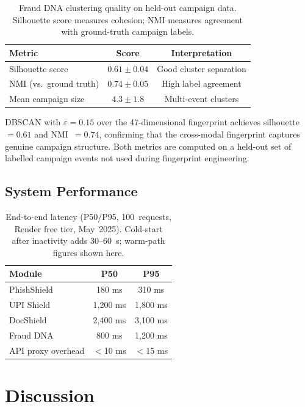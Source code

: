 \documentclass[conference]{IEEEtran}
\begin{document}
\begin{table}[t]
\caption{Fraud DNA clustering quality on held-out campaign data.
Silhouette score measures cohesion; NMI measures agreement with
ground-truth campaign labels.}
\label{tab:frauddna}
\centering
\small
\begin{tabular}{lcc}
\toprule
\textbf{Metric} & \textbf{Score} & \textbf{Interpretation} \\
\midrule
Silhouette score          & $0.61{\pm}0.04$ & Good cluster separation \\
NMI (vs.\ ground truth)   & $0.74{\pm}0.05$ & High label agreement \\
Mean campaign size         & $4.3{\pm}1.8$   & Multi-event clusters \\
\bottomrule
\end{tabular}
\end{table}

DBSCAN with $\varepsilon{=}0.15$ over the 47-dimensional fingerprint
achieves silhouette~$=0.61$ and NMI~$=0.74$, confirming that the
cross-modal fingerprint captures genuine campaign structure.
Both metrics are computed on a held-out set of labelled campaign events
not used during fingerprint engineering.

\subsection{System Performance}\label{sec:sysperf}

\begin{table}[t]
\caption{End-to-end latency (P50/P95, 100~requests, Render free tier,
May~2025). Cold-start after inactivity adds 30--60~s; warm-path figures
shown here.}
\label{tab:latency}
\centering
\small
\begin{tabular}{lcc}
\toprule
\textbf{Module} & \textbf{P50} & \textbf{P95} \\
\midrule
PhishShield        & 180 ms    & 310 ms \\
UPI Shield         & 1{,}200 ms & 1{,}800 ms \\
DocShield          & 2{,}400 ms & 3{,}100 ms \\
Fraud DNA          & 800 ms    & 1{,}200 ms \\
API proxy overhead & $<$10 ms  & $<$15 ms \\
\bottomrule
\end{tabular}
\end{table}

\section{Discussion}\label{sec:discussion}
\end{document}
